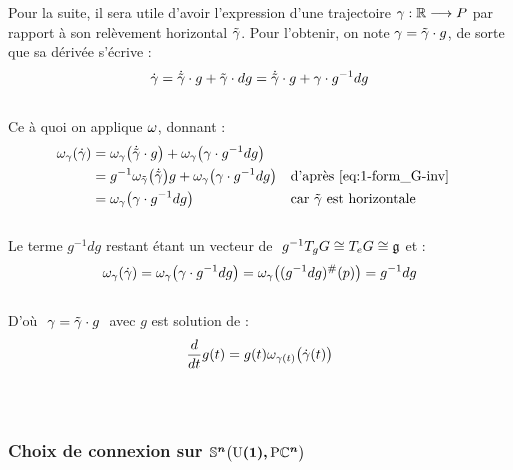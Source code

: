 Pour la suite, il sera utile d'avoir l'expression d'une trajectoire $\gamma:\mathbb{R}\longrightarrow P$ par rapport à son relèvement horizontal $\Tilde{\gamma}$. Pour l'obtenir, on note  $\gamma = \Tilde{\gamma}\cdot g$, de sorte que sa dérivée s'écrive :
\[\dot{\gamma} = \dot{\Tilde{\gamma}}\cdot g + \Tilde{\gamma}\cdot dg = \dot{\Tilde{\gamma}}\cdot g + \gamma \cdot g^{-1}dg\]
\\
Ce à quoi on applique $\omega$, donnant :
\begin{align*}
	\omega_\gamma(\dot{\gamma}) &= \omega_\gamma\big( \dot{\Tilde{\gamma}}\cdot g \big) + \omega_\gamma \big( \gamma \cdot g^{-1}dg \big) \\
	&= g^{-1}\omega_{\Tilde{\gamma}}\big(\dot{\Tilde{\gamma}} \big) g + \omega_\gamma \big( \gamma \cdot g^{-1}dg \big)   &  &\text{d'après \eqref{eq:1-form_G-inv}} \\
	&= \omega_\gamma \big( \gamma \cdot g^{-1}dg \big)  &  &\text{car $\Tilde{\gamma}$ est horizontale}
\end{align*}
\\
Le terme $g^{-1}dg$ restant étant un vecteur de $\ g^{-1}\tg[g]{G}\cong \tg[e]{G}\cong \mathfrak{g}$ et :
\[\omega_\gamma(\dot{\gamma}) = \omega_\gamma \big( \gamma \cdot g^{-1}dg \big) = \omega_\gamma \big( (g^{-1}dg)^\#(p) \big) = g^{-1}dg\]
\\
D'où $\ \gamma = \Tilde{\gamma}\cdot g\ $ avec $g$ est solution de :
\begin{equation} \label{eq:deviation2hozi}
	\frac{d}{dt}g(t)  = g(t) \omega_{\gamma(t)}\big( \dot{\gamma}(t) \big)
\end{equation}
\\
\\



\subsubsection{Choix de connexion sur $\boldsymbol{\mathbb{ S}^{n}\big(\text{\normalfont U}(1),\text{\normalfont P}\mathbb{C}^{n}\big)}$}\label{subsec:conn2SUPC}

